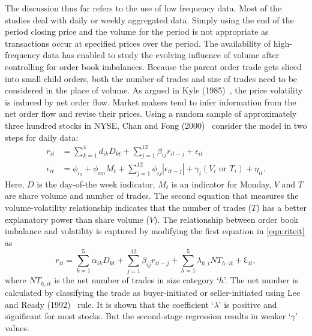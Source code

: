 The discussion thus far refers to the use of low frequency data. Most of the studies deal with daily or weekly aggregated data. Simply using the end of the period closing price and the volume for the period is not appropriate as transactions occur at specified prices over the period. The availability of high-frequency data has enabled to study the evolving influence of volume after controlling for order book imbalances. Because the parent order trade gets sliced into small child orders, both the number of trades and size of trades need to be considered in the place of volume. As argued in Kyle (1985)~\cite{kyle1985}, the price volatility is induced by net order flow. Market makers tend to infer information from the net order flow and revise their prices. Using a random sample of approximately three hundred stocks in NYSE, Chan and Fong (2000)~\cite{chanfong} consider the model in two steps for daily data: 
	\begin{equation} \label{eqn:riteit}
	\begin{split}
	r_{it} &= \sum_{k=1}^4 d_{ik} D_{kt} + \sum_{j=1}^{12} \beta_{ij} r_{it-j} + \epsilon_{it} \\
	\epsilon_{it} &= \phi_{i_0} + \phi_{im} M_t + \sum_{j=1}^{12} \phi_{ij} |\epsilon_{it-j}| + \gamma_i (V_i \text{ or }T_i) + \eta_{it}.
	\end{split}
	\end{equation}
Here, $D$ is the day-of-the week indicator, $M_t$ is an indicator for Monday, $V$ and $T$ are share volume and number of trades. The second equation that measures the volume-volatility relationship indicates that the number of trades ($T$) has a better explanatory power than share volume ($V$). The relationship between order book imbalance and volatility is captured by modifying the first equation in \eqref{eqn:riteit} as
	\begin{equation}\label{eqn:rit32}
	r_{it}= \sum_{k=1}^5 \alpha_{ik} D_{kt} + \sum_{j=1}^{12} \beta_{ij} r_{it-j} + \sum_{h=1}^5 \lambda_{h,i} N T_{h\cdot it} + \Eulerconst_{it},
	\end{equation}
where $NT_{h,it}$ is the net number of trades in size category `$h$'. The net number is calculated by classifying the trade as buyer-initiated or seller-initiated using Lee and Ready (1992)~\cite{leeready} rule. It is shown that the coefficient `$\lambda$' is positive and significant for most stocks. But the second-stage regression results in weaker `$\gamma$' values. 


